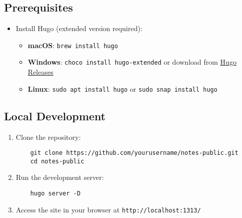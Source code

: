 \documentclass{article}
\begin{document}
\subsection{Prerequisites}
\begin{itemize}
  \item Install Hugo (extended version required):
  \begin{itemize}
    \item \textbf{macOS}: \texttt{brew install hugo}
    \item \textbf{Windows}: \texttt{choco install hugo-extended} or download from \href{https://github.com/gohugoio/hugo/releases}{Hugo Releases}
    \item \textbf{Linux}: \texttt{sudo apt install hugo} or \texttt{sudo snap install hugo}
  \end{itemize}
\end{itemize}

\subsection{Local Development}
\begin{enumerate}
  \item Clone the repository:
  \begin{verbatim}
    git clone https://github.com/yourusername/notes-public.git
    cd notes-public
  \end{verbatim}

  \item Run the development server:
  \begin{verbatim}
    hugo server -D
  \end{verbatim}

  \item Access the site in your browser at \texttt{http://localhost:1313/}
\end{enumerate}
\end{document}
